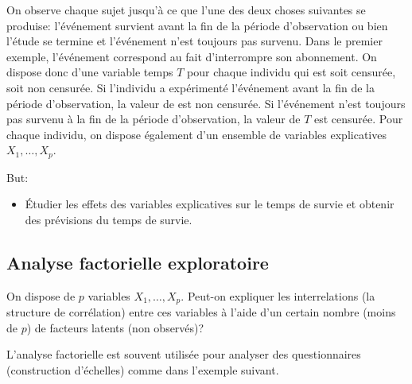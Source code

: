 \documentclass[
  11pt,
  letterpaper,
]{scrbook}
\providecommand{\tightlist}{%
  \setlength{\itemsep}{0pt}\setlength{\parskip}{0pt}}\usepackage{longtable,booktabs,array}
\theoremstyle{definition}
\theoremstyle{remark}
\begin{document}
On observe chaque sujet jusqu'à ce que l'une des deux choses suivantes
se produise: l'événement survient avant la fin de la période
d'observation ou bien l'étude se termine et l'événement n'est toujours
pas survenu. Dans le premier exemple, l'événement correspond au fait
d'interrompre son abonnement. On dispose donc d'une variable temps \(T\)
pour chaque individu qui est soit censurée, soit non censurée. Si
l'individu a expérimenté l'événement avant la fin de la période
d'observation, la valeur de est non censurée. Si l'événement n'est
toujours pas survenu à la fin de la période d'observation, la valeur de
\(T\) est censurée. Pour chaque individu, on dispose également d'un
ensemble de variables explicatives \(X_1, \ldots, X_p\).

But:

\begin{itemize}
\tightlist
\item
  Étudier les effets des variables explicatives sur le temps de survie
  et obtenir des prévisions du temps de survie.
\end{itemize}

\subsection{Analyse factorielle
exploratoire}\label{analyse-factorielle-exploratoire}

On dispose de \(p\) variables \(X_1, \ldots, X_p\). Peut-on expliquer
les interrelations (la structure de corrélation) entre ces variables à
l'aide d'un certain nombre (moins de \(p\)) de facteurs latents (non
observés)?

L'analyse factorielle est souvent utilisée pour analyser des
questionnaires (construction d'échelles) comme dans l'exemple suivant.
\end{document}
